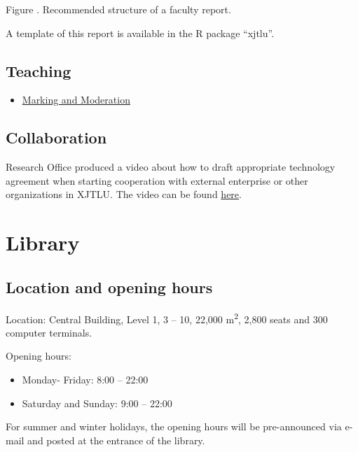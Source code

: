 \documentclass[
]{book}
\providecommand{\tightlist}{%
  \setlength{\itemsep}{0pt}\setlength{\parskip}{0pt}}
\begin{document}
Figure \label{fig:report}. Recommended structure of a faculty report.

A template of this report is available in the R package ``xjtlu''.

\hypertarget{teaching}{%
\section{Teaching}\label{teaching}}

\begin{itemize}
\tightlist
\item
  \href{https://ice.xjtlu.edu.cn/course/view.php?id=1605\&section=1}{Marking and Moderation}
\end{itemize}

\hypertarget{collaboration}{%
\section{Collaboration}\label{collaboration}}

Research Office produced a video about how to draft appropriate technology agreement when starting cooperation with external enterprise or other organizations in XJTLU. The video can be found \href{https://box.xjtlu.edu.cn/smart-link/d0dc536d-1b5f-4a75-bcce-087a14a929ad/}{here}.

\hypertarget{library}{%
\chapter{Library}\label{library}}

\hypertarget{location-and-opening-hours}{%
\section{Location and opening hours}\label{location-and-opening-hours}}

Location: Central Building, Level 1, 3 -- 10, 22,000 m\textsuperscript{2}, 2,800 seats and 300 computer terminals.

Opening hours:

\begin{itemize}
\item
  Monday- Friday: 8:00 -- 22:00
\item
  Saturday and Sunday: 9:00 -- 22:00
\end{itemize}

For summer and winter holidays, the opening hours will be pre-announced via e-mail and posted at the entrance of the library.
\end{document}
